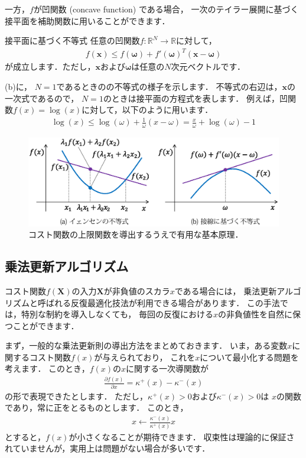 一方，$f$が凹関数 (concave function) である場合，
一次のテイラー展開に基づく接平面を補助関数に用いることができます．
\begin{theobox}{接平面に基づく不等式}
\label{jensen}
任意の凹関数$f:\mathbb{R}^N \rightarrow \mathbb{R}$に対して，
\begin{align}
f(\bm{x}) \le f(\bm\omega) + f'(\bm\omega)^T(\bm{x} - \bm\omega)
\end{align}
が成立します．ただし，$\bm{x}$および$\bm\omega$は任意の$N$次元ベクトルです．\\[-4mm]
\end{theobox}
(b)に，
$N=1$であるときのの不等式の様子を示します．
不等式の右辺は，$\bm{x}$の一次式であるので，
$N=1$のときは接平面の方程式を表します．
例えば，凹関数$f(x) = \log (x)$に対して，以下のように用います．
\begin{align}
\log(x) \le \log(\omega) + \frac{1}{\omega}(x - \omega) = \frac{x}{\omega} + \log(\omega) - 1
\end{align}

\begin{figure}[t]
\centering
\includegraphics[width=.98\linewidth]{sections/optimization/aux_function_conv_concave}
\vspace{-2mm}
\caption{コスト関数の上限関数を導出するうえで有用な基本原理．}
\label{fig:aux_function_conv_concave}
\end{figure}

\subsection{乗法更新アルゴリズム}
\label{sec:multiplicative_update}

コスト関数$f(\bm{X})$の入力$\bm{X}$が非負値のスカラ$x$である場合には，
乗法更新アルゴリズムと呼ばれる反復最適化技法が利用できる場合があります．
この手法では，特別な制約を導入しなくても，
毎回の反復における$x$の非負値性を自然に保つことができます．

まず，一般的な乗法更新則の導出方法をまとめておきます．
いま，ある変数$x$に関するコスト関数$f(x)$が与えられており，
これを$x$について最小化する問題を考えます．
このとき，$f(x)$の$x$に関する一次導関数が
\begin{align}
\frac{\partial f(x)}{\partial x} = \kappa^+(x) - \kappa^-(x)
\end{align}
の形で表現できたとします．
ただし，$\kappa^+(x) > 0$および$\kappa^-(x) > 0$は
$x$の関数であり，常に正をとるものとします．
このとき，
\begin{align}
x \gets \frac{\kappa^-(x)}{\kappa^+(x)} x
\end{align}
とすると，$f(x)$が小さくなることが期待できます．
収束性は理論的に保証されていませんが，実用上は問題がない場合が多いです．

